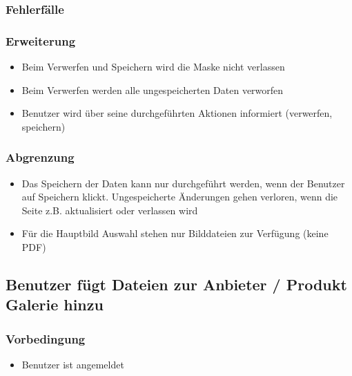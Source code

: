 \documentclass[a4paper,12pt]{article}
\begin{document}
\subsubsection{Fehlerfälle}\label{fehlerfalle-4}

\subsubsection{Erweiterung}\label{erweiterung-4}

\begin{itemize}

\item
  Beim Verwerfen und Speichern wird die Maske nicht verlassen
\item
  Beim Verwerfen werden alle ungespeicherten Daten verworfen
\item
  Benutzer wird über seine durchgeführten Aktionen informiert
  (verwerfen, speichern)
\end{itemize}

\subsubsection{Abgrenzung}\label{abgrenzung-4}

\begin{itemize}

\item
  Das Speichern der Daten kann nur durchgeführt werden, wenn der
  Benutzer auf Speichern klickt. Ungespeicherte Änderungen gehen
  verloren, wenn die Seite z.B. aktualisiert oder verlassen wird
\item
  Für die Hauptbild Auswahl stehen nur Bilddateien zur Verfügung (keine
  PDF)
\end{itemize}

\subsection{Benutzer fügt Dateien zur Anbieter / Produkt Galerie hinzu}

\subsubsection{Vorbedingung}\label{vorbedingung-5}

\begin{itemize}

\item
  Benutzer ist angemeldet
\end{itemize}
\end{document}
